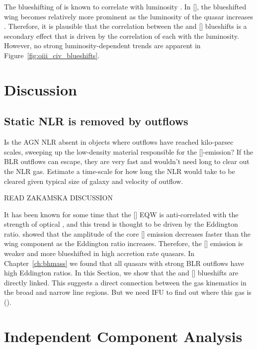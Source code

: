 The blueshifting of  is known to correlate with luminosity \citep{richards11}.
In [], the blueshifted wing becomes relatively more prominent as the luminosity of the quasar increases \citep{shen14}. 
Therefore, it is plausible that the correlation between the  and [] blueshifts is a secondary effect that is driven by the correlation of each with the luminosity. 
However, no strong luminosity-dependent trends are apparent in Figure~\ref{fig:oiii_civ_blueshifts}. 

\section{Discussion}

\subsection{Static NLR is removed by outflows}

Is the AGN NLR absent in objects where outflows have reached kilo-parsec scales, sweeping up the low-density material responsible for the []-emission?
If the BLR outflows can escape, they are very fast and wouldn't need long to clear out the NLR gas. 
Estimate a time-scale for how long the NLR would take to be cleared given typical size of galaxy and velocity of outflow. 

READ ZAKAMSKA DISCUSSION

It has been known for some time that the [] EQW is anti-correlated with the strength of optical , and this trend is thought to be driven by the Eddington ratio. 
\citet{shen14} showed that the amplitude of the core [] emission decreases faster than the wing component as the Eddington ratio increases. 
Therefore, the [] emission is weaker and more blueshifted in high accretion rate quasars.  
In Chapter~\ref{ch:bhmass} we found that all quasars with strong BLR outflows have high Eddington ratios. 
In this Section, we show that the  and [] blueshifts are directly linked. 
This suggests a direct connection between the gas kinematics in the broad and narrow line regions. 
But we need IFU to find out where this gas is (). 


\section{Independent Component Analysis}

